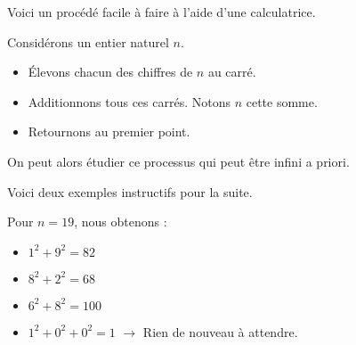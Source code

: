 Voici un procédé facile à faire à l'aide d'une calculatrice.


\medskip

\begin{tcolorbox}
    Considérons un entier naturel $n$.

    \begin{itemize}[label = \small\textbullet]
        \item Élevons chacun des chiffres de $n$ au carré.

        \item Additionnons tous ces carrés. Notons $n$ cette somme.

        \item Retournons au premier point.
    \end{itemize}

    On peut alors étudier ce processus qui peut être infini a priori.
\end{tcolorbox}

Voici deux exemples instructifs pour la suite.


\begin{example}
    Pour $n = 19$, nous obtenons :
    \begin{itemize}[label=\textbullet]
        \item $1^2 + 9^2 = 82$
        \item $8^2 + 2^2 = 68$
        \item $6^2 + 8^2 = 100$
        \item $1^2 + 0^2 + 0^2 = 1$ $\rightarrow$ Rien de nouveau à attendre.
    \end{itemize}
\end{example}


